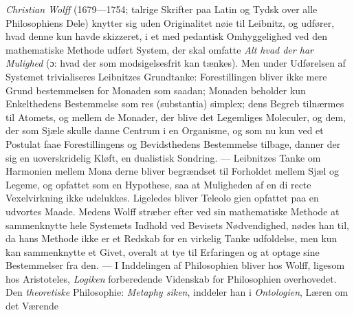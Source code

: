 \documentclass[12pt,a4paper]{book}
\begin{document}
\emph{Christian Wolff} (1679---1754; talrige Skrifter paa
Latin og Tydsk over alle Philosophiens Dele) knytter sig uden
Originalitet nøie til Leibnitz, og udfører, hvad denne kun
havde skizzeret, i et med pedantisk Omhyggelighed ved den
mathematiske Methode udført System, der skal omfatte \emph{Alt
hvad der har Mulighed} (ɔ: hvad der som modsigelsesfrit
kan tænkes). Men under Udførelsen af Systemet trivialiseres
Leibnitzes Grundtanke: Forestillingen bliver ikke mere Grund\-%
bestemmelsen for Monaden som saadan; Monaden beholder
kun Enkelthedens Bestemmelse som res (substantia) simplex;
dens Begreb tilnærmes til Atomets, og mellem de Monader,
der blive det Legemliges Moleculer, og dem, der som Sjæle
skulle danne Centrum i en Organisme, og som nu kun ved et
Postulat faae Forestillingens og Bevidsthedens Bestemmelse
tilbage, danner der sig en uoverskridelig Kløft, en dualistisk
Sondring. --- Leibnitzes Tanke om Harmonien mellem Mona\-%
derne bliver begrændset til Forholdet mellem Sjæl og Legeme,
og opfattet som en Hypothese, saa at Muligheden af en di\-%
recte Vexelvirkning ikke udelukkes. Ligeledes bliver Teleolo\-%
gien opfattet paa en udvortes Maade. Medens Wolff stræber
efter ved sin mathematiske Methode at sammenknytte hele
Systemets Indhold ved Bevisets Nødvendighed, nødes han til,
da hans Methode ikke er et Redskab for en virkelig Tanke\-%
udfoldelse, men kun kan sammenknytte et Givet, overalt at
tye til Erfaringen og at optage sine Bestemmelser fra den. ---
I Inddelingen af Philosophien bliver hos Wolff, ligesom hos
Aristoteles, \emph{Logiken} forberedende Videnskab for Philosophien
overhovedet. Den \emph{theoretiske} Philosophie: \emph{Metaphy\-%
siken}, inddeler han i \emph{Ontologien}, Læren om det Værende
\end{document}
